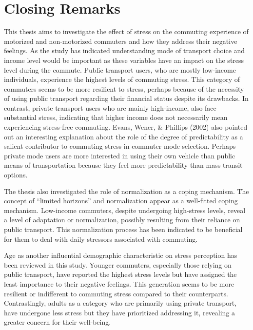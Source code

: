 \documentclass[
11pt, %
oneside, %
english, %
singlespacing, %
]{macthesis} %
\begin{document}
\hypertarget{closing-remarks}{%
\section{Closing Remarks}\label{closing-remarks}}

This thesis aims to investigate the effect of stress on the commuting experience of motorized and non-motorized commuters and how they address their negative feelings. As the study has indicated understanding mode of transport choice and income level would be important as these variables have an impact on the stress level during the commute. Public transport users, who are mostly low-income individuals, experience the highest levels of commuting stress. This category of commuters seems to be more resilient to stress, perhaps because of the necessity of using public transport regarding their financial status despite its drawbacks. In contrast, private transport users who are mainly high-income, also face substantial stress, indicating that higher income does not necessarily mean experiencing stress-free commuting. Evans, Wener, \& Phillips (2002) also pointed out an interesting explanation about the role of the degree of predictability as a salient contributor to commuting stress in commuter mode selection. Perhaps private mode users are more interested in using their own vehicle than public means of transportation because they feel more predictability than mass transit options.

The thesis also investigated the role of normalization as a coping mechanism. The concept of ``limited horizons'' and normalization appear as a well-fitted coping mechanism. Low-income commuters, despite undergoing high-stress levels, reveal a level of adaptation or normalization, possibly resulting from their reliance on public transport. This normalization process has been indicated to be beneficial for them to deal with daily stressors associated with commuting.

Age as another influential demographic characteristic on stress perception has been reviewed in this study. Younger commuters, especially those relying on public transport, have reported the highest stress levels but have assigned the least importance to their negative feelings. This generation seems to be more resilient or indifferent to commuting stress compared to their counterparts. Contrastingly, adults as a category who are primarily using private transport, have undergone less stress but they have prioritized addressing it, revealing a greater concern for their well-being.
\end{document}
